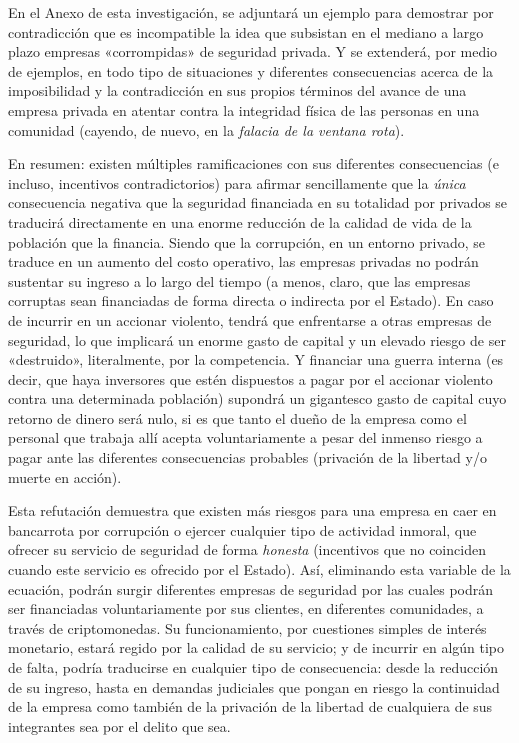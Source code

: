 \documentclass[12pt,a4paper,twoside]{book}
\begin{document}
En el Anexo de esta investigación, se adjuntará un ejemplo para demostrar por contradicción que es incompatible la idea que subsistan en el mediano a largo plazo empresas «corrompidas» de seguridad privada. Y se extenderá, por medio de ejemplos, en todo tipo de situaciones y diferentes consecuencias acerca de la imposibilidad y la contradicción en sus propios términos del avance de una empresa privada en atentar contra la integridad física de las personas en una comunidad (cayendo, de nuevo, en la \textit{falacia de la ventana rota}).

En resumen: existen múltiples ramificaciones con sus diferentes consecuencias (e incluso, incentivos contradictorios) para afirmar sencillamente que la \textit{única} consecuencia negativa que la seguridad financiada en su totalidad por privados se traducirá directamente en una enorme reducción de la calidad de vida de la población que la financia. Siendo que la corrupción, en un entorno privado, se traduce en un aumento del costo operativo, las empresas privadas no podrán sustentar su ingreso a lo largo del tiempo (a menos, claro, que las empresas corruptas sean financiadas de forma directa o indirecta por el Estado). En caso de incurrir en un accionar violento, tendrá que enfrentarse a otras empresas de seguridad, lo que implicará un enorme gasto de capital y un elevado riesgo de ser «destruido», literalmente, por la competencia. Y financiar una guerra interna (es decir, que haya inversores que estén dispuestos a pagar por el accionar violento contra una determinada población) supondrá un gigantesco gasto de capital cuyo retorno de dinero será nulo, si es que tanto el dueño de la empresa como el personal que trabaja allí acepta voluntariamente  a pesar del inmenso riesgo a pagar  ante las diferentes consecuencias probables (privación de la libertad y/o muerte en acción).

Esta refutación demuestra que existen más riesgos para una empresa en caer en bancarrota por corrupción o ejercer cualquier tipo de actividad inmoral, que ofrecer su servicio de seguridad de forma \textit{honesta} (incentivos que no coinciden cuando este servicio es ofrecido por el Estado). Así, eliminando esta variable de la ecuación, podrán surgir diferentes empresas de seguridad por las cuales podrán ser financiadas voluntariamente por sus clientes, en diferentes comunidades, a través de criptomonedas. Su funcionamiento, por cuestiones simples de interés monetario, estará regido por la calidad de su servicio; y de incurrir en algún tipo de falta, podría traducirse en cualquier tipo de consecuencia: desde la reducción de su ingreso, hasta en demandas judiciales que pongan en riesgo la continuidad de la empresa como también de la privación de la libertad de cualquiera de sus integrantes sea por el delito que sea.
\end{document}
